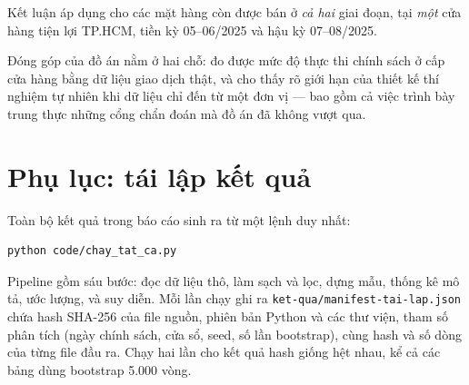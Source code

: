 \documentclass[11pt]{article}
\begin{document}
Kết luận áp dụng cho các mặt hàng còn được bán ở \emph{cả hai} giai đoạn, tại \emph{một} cửa hàng
tiện lợi TP.HCM, tiền kỳ 05--06/2025 và hậu kỳ 07--08/2025.

Đóng góp của đồ án nằm ở hai chỗ: đo được mức độ thực thi chính sách ở cấp cửa hàng bằng dữ liệu
giao dịch thật, và cho thấy rõ giới hạn của thiết kế thí nghiệm tự nhiên khi dữ liệu chỉ đến từ một
đơn vị --- bao gồm cả việc trình bày trung thực những cổng chẩn đoán mà đồ án đã không vượt qua.

\appendix
\section{Phụ lục: tái lập kết quả}

Toàn bộ kết quả trong báo cáo sinh ra từ một lệnh duy nhất:

\begin{verbatim}
python code/chay_tat_ca.py
\end{verbatim}

Pipeline gồm sáu bước: đọc dữ liệu thô, làm sạch và lọc, dựng mẫu, thống kê mô tả, ước lượng, và
suy diễn. Mỗi lần chạy ghi ra \texttt{ket-qua/manifest-tai-lap.json} chứa hash SHA-256 của file
nguồn, phiên bản Python và các thư viện, tham số phân tích (ngày chính sách, cửa sổ, seed, số lần
bootstrap), cùng hash và số dòng của từng file đầu ra. Chạy hai lần cho kết quả hash giống hệt nhau,
kể cả các bảng dùng bootstrap 5.000 vòng.
\end{document}
